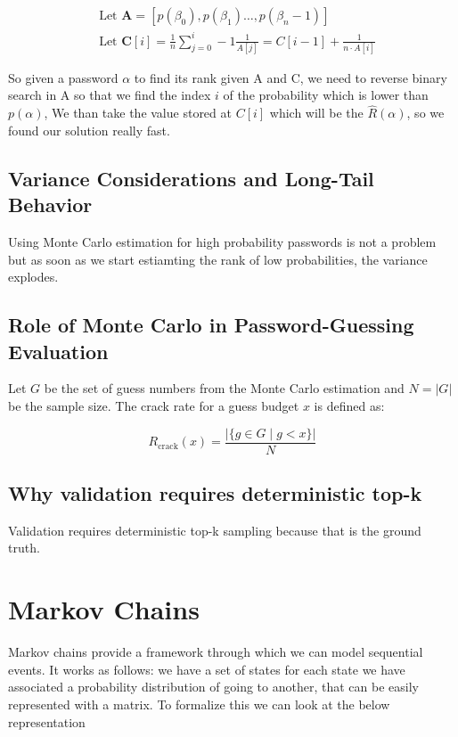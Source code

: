 \documentclass[english,noexaminfo,a4paper,oneside, binding = 0.6cm]{sapthesis}
\begin{document}
\begin{align*}
&\text{Let } \mathbf{A} = [p(\beta_0),p(\beta_1)\dots,p(\beta_n-1)]\\
&\text{Let } \mathbf{C}[i] = \frac{1}{n}\sum_{j=0}^i-1 \frac{1}{A[j]} = C[i-1] + \frac{1}{n\cdot A[i]}  
\label{eq:optestimaterank}
\end{align*}

So given a password $\alpha$ to find its rank given A and C, we need to reverse binary search  in A so that we find the index $i$ of the probability which is lower than $p(\alpha)$,
We than take the value stored at $C[i]$ which will be the $\hat{R}(\alpha)$, so we found our solution really fast.

\subsection{Variance Considerations and Long-Tail Behavior}
Using Monte Carlo estimation for high probability passwords is not a problem but as soon as we start estiamting the rank of low probabilities, the variance explodes.

\subsection{Role of Monte Carlo in Password-Guessing Evaluation}
Let $G$ be the set of guess numbers from the Monte Carlo estimation and $N = |G|$ be the sample size. The crack rate for a guess budget $x$ is defined as:

\begin{equation}
    R_{\text{crack}}(x) = \frac{\left| \{ g \in G \mid g < x \} \right|}{N}
\end{equation}
\subsection{Why validation requires deterministic top-k}
Validation requires deterministic top-k sampling because that is the ground truth.

\section{Markov Chains}
Markov chains provide a framework through which we can model sequential 
events. It works as follows: 
we have a set of states for each state we have associated a 
probability distribution of going to another, that can be easily 
represented with a matrix.
To formalize this we can look at the below representation
\end{document}
